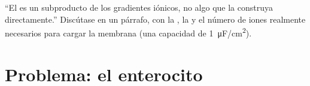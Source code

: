 \begin{exercise}[$\star\star\star$]\label{exo:b1:membranes-transport:12}
``El  es un subproducto de los gradientes iónicos, no
algo que la  construya directamente.'' Discútase en un párrafo, con la
, la  y el número de iones realmente necesarios para
cargar la membrana (una capacidad de \qty{1}{\micro F/cm^2}).
\end{exercise}

\section{Problema: el enterocito}


